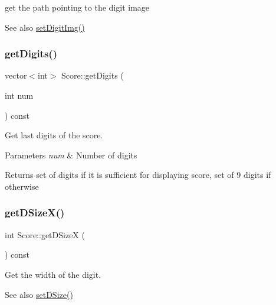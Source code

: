get the path pointing to the digit image 

\begin{DoxySeeAlso}{See also}
\mbox{\hyperlink{class_score_aa832d21b704451b0a1d9f354d1bd1af2}{set\+Digit\+Img()}} 
\end{DoxySeeAlso}
\mbox{\label{class_score_ab86681a8b679799d50117a2a21618326}} 
\subsubsection{\texorpdfstring{get\+Digits()}{getDigits()}}
{\footnotesize\ttfamily vector$<$int$>$ Score\+::get\+Digits (\begin{DoxyParamCaption}\item[{int}]{num }\end{DoxyParamCaption}) const\hspace{0.3cm}{\ttfamily [inline]}}



Get last digits of the score. 


\begin{DoxyParams}{Parameters}
{\em num} & Number of digits \\
\hline
\end{DoxyParams}
\begin{DoxyReturn}{Returns}
set of digits if it is sufficient for displaying score, set of 9 digits if otherwise 
\end{DoxyReturn}
\mbox{\label{class_score_a5c4891bd7ea2e4baefe364a5bc281861}} 
\subsubsection{\texorpdfstring{get\+D\+Size\+X()}{getDSizeX()}}
{\footnotesize\ttfamily int Score\+::get\+D\+SizeX (\begin{DoxyParamCaption}{ }\end{DoxyParamCaption}) const\hspace{0.3cm}{\ttfamily [inline]}}



Get the width of the digit. 

\begin{DoxySeeAlso}{See also}
\mbox{\hyperlink{class_score_a86b1e2a967847b148f79504ef7d4e866}{set\+D\+Size()}} 
\end{DoxySeeAlso}
\mbox{\label{class_score_ae7da6b9ad72bb407098a37aecc085d28}} 
